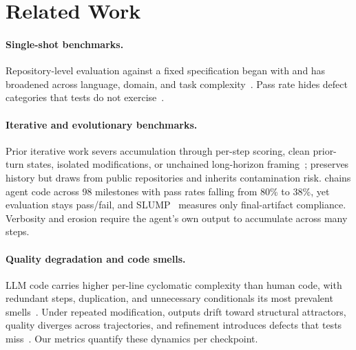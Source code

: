 \section{Related Work}
\label{sec:related_work}

\paragraph{Single-shot benchmarks.} Repository-level evaluation against a fixed specification began with \citet{swe-bench} and has broadened across language, domain, and task complexity~\citep{multi-swe-bench, swe-polybench, longcli-bench, fea-bench, commit0}. Pass rate hides defect categories that tests do not exercise~\citep{swe-abs, lessleak-bench}.

\paragraph{Iterative and evolutionary benchmarks.} Prior iterative work severs accumulation through per-step scoring, clean prior-turn states, isolated modifications, or unchained long-horizon framing~\citep{sr-eval, recode-h, codeflowbench, maintaincoder, humanevo, thai2025-swe-evo}; \citet{swe-ci} preserves history but draws from public repositories and inherits contamination risk. \citet{evoclaw} chains agent code across 98 milestones with pass rates falling from 80\% to 38\%, yet evaluation stays pass/fail, and SLUMP~\citep{slump} measures only final-artifact compliance. Verbosity and erosion require the agent's own output to accumulate across many steps.

\paragraph{Quality degradation and code smells.} LLM code carries higher per-line cyclomatic complexity than human code, with redundant steps, duplication, and unnecessary conditionals its most prevalent smells~\citep{dou2024-whats-wrong-llm-code, abbassi2025-taxonomy-inefficiencies, cotroneo2025-human-vs-ai}. Under repeated modification, outputs drift toward structural attractors, quality diverges across trajectories, and refinement introduces defects that tests miss~\citep{iterative-readability, chen2025-patch-quality, santos2025-software-aging, scaffold-cegis, diff-fuzzing-refactoring, bohr2025-show-and-tell, interaction-smells, overcorrection-reviewers, more-rounds-more-noise, nakashima2026-agentic-prs, vibe-coding-overhead}. Our metrics quantify these dynamics per checkpoint.
